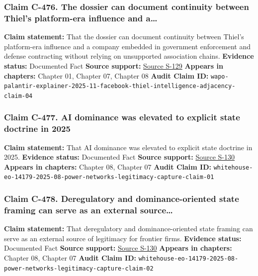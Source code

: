\documentclass[
  american,
  11pt,
  letterpaper,
]{article}
\begin{document}
\subsubsection{Claim C-476. The dossier can document continuity between
Thiel's platform-era influence and
a\ldots{}}\label{claim-c-476-the-dossier-can-document-continuity-between-thiel-s-platform-era-influence-and-a}

\textbf{Claim statement:} That the dossier can document continuity
between Thiel's platform-era influence and a company embedded in
government enforcement and defense contracting without relying on
unsupported association chains. \textbf{Evidence status:} Documented
Fact \textbf{Source support:}
\hyperref[source-s-129-what-to-know-about-palantir-the-tech-company-playing-a-key-role-for-ice]{Source
S-129} \textbf{Appears in chapters:} Chapter 01, Chapter 07, Chapter 08
\textbf{Audit Claim ID:}
\texttt{wapo-palantir-explainer-2025-11-facebook-thiel-intelligence-adjacency-claim-04}

\subsubsection{Claim C-477. AI dominance was elevated to explicit state
doctrine in
2025}\label{claim-c-477-ai-dominance-was-elevated-to-explicit-state-doctrine-in-2025}

\textbf{Claim statement:} That AI dominance was elevated to explicit
state doctrine in 2025. \textbf{Evidence status:} Documented Fact
\textbf{Source support:}
\hyperref[source-s-130-removing-barriers-to-american-leadership-in-artificial-intelligence]{Source
S-130} \textbf{Appears in chapters:} Chapter 08, Chapter 07
\textbf{Audit Claim ID:}
\texttt{whitehouse-eo-14179-2025-08-power-networks-legitimacy-capture-claim-01}

\subsubsection{Claim C-478. Deregulatory and dominance-oriented state
framing can serve as an external
source\ldots{}}\label{claim-c-478-deregulatory-and-dominance-oriented-state-framing-can-serve-as-an-external-source}

\textbf{Claim statement:} That deregulatory and dominance-oriented state
framing can serve as an external source of legitimacy for frontier
firms. \textbf{Evidence status:} Documented Fact \textbf{Source
support:}
\hyperref[source-s-130-removing-barriers-to-american-leadership-in-artificial-intelligence]{Source
S-130} \textbf{Appears in chapters:} Chapter 08, Chapter 07
\textbf{Audit Claim ID:}
\texttt{whitehouse-eo-14179-2025-08-power-networks-legitimacy-capture-claim-02}
\end{document}
